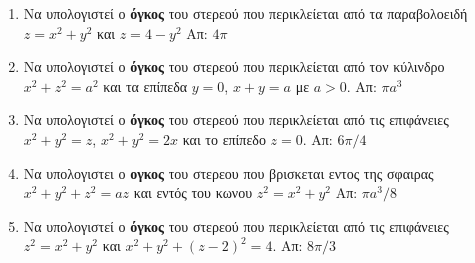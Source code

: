 \begin{enumerate}
  \item Να υπολογιστεί ο \textbf{όγκος} του στερεού που περικλείεται από τα παραβολοειδή 
    $ z=x^{2}+y^{2} $ και $ z = 4-y^{2} $ \hfill Απ: $ 4 \pi $ 

  \item Να υπολογιστεί ο \textbf{όγκος} του στερεού που περικλείεται από τον κύλινδρο 
    $ x^{2}+z^{2}=a^{2} $ και τα επίπεδα $ y=0 $, $ x+y=a $ με $ a>0 $.
    \hfill Απ: $ \pi a^{3} $ 

  \item Να υπολογιστεί ο \textbf{όγκος} του στερεού που περικλείεται από τις επιφάνειες 
    $ x^{2}+y^{2}=z $, $ x^{2}+y^{2}=2x $ και το επίπεδο $ z=0 $. \hfill Απ: $
    {6 \pi}/{4} $ 

  \item Να υπολογιστει ο \textbf{ογκος} του στερεου που βρισκεται εντος της σφαιρας 
    $x^2+y^2+z^2=az$ και εντός του κωνου $z^2=x^2+y^2$ 
    \hfill Απ: $\pi{a^3}/{8}$

  \item Να υπολογιστεί ο \textbf{όγκος} του στερεού που περικλείεται από τις επιφάνειες 
    $ z^{2}\!=x^{2}+y^{2} $ και $ x^{2}+y^{2}\!+(z-2)^{2}=4 $.  
    \hfill Απ: $ {8 \pi}/{3} $ 
\end{enumerate}




